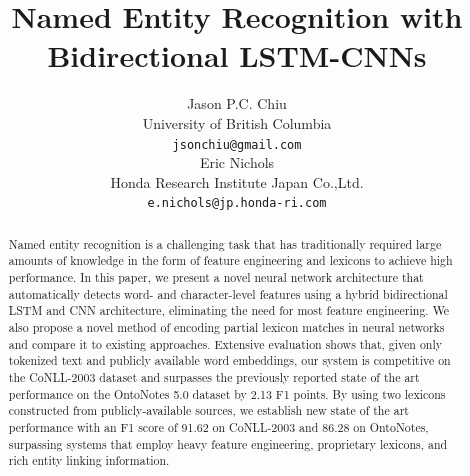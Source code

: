 \documentclass[11pt,letterpaper]{article}
\title{Named Entity Recognition with Bidirectional LSTM-CNNs}
\author{
  Jason P.C. Chiu \\
  University of British Columbia \\
  {\tt jsonchiu@gmail.com} \\ \And
  Eric Nichols \\
  Honda Research Institute Japan Co.,Ltd. \\
  {\tt e.nichols@jp.honda-ri.com} \\
}
\date{}
\begin{document}
\maketitle
\begin{abstract}



Named entity recognition is a challenging task that has traditionally required large amounts of knowledge in the form of feature engineering and lexicons to achieve high performance. In this paper, we present a novel neural network architecture that automatically detects word- and character-level features using a hybrid bidirectional LSTM and CNN architecture, eliminating the need for most feature engineering. We also propose a novel method of encoding partial lexicon matches in neural networks and compare it to existing approaches.
Extensive evaluation shows that, given only tokenized text and publicly available word embeddings, our system is competitive on the CoNLL-2003 dataset and surpasses the previously reported state of the art performance on the OntoNotes 5.0 dataset by 2.13 F1 points. By using two lexicons constructed from publicly-available sources, we establish new state of the art performance with an F1 score of 91.62 on CoNLL-2003 and 86.28 on OntoNotes, surpassing systems that employ heavy feature engineering, proprietary lexicons, and rich entity linking information.

\end{abstract}
\end{document}
